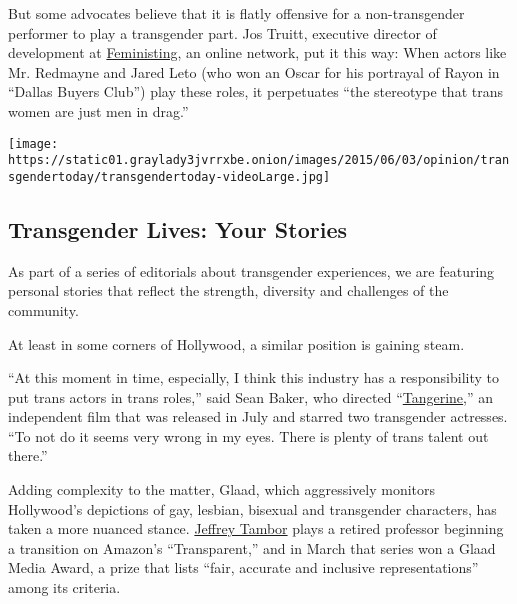 But some advocates believe that it is flatly offensive for a
non-transgender performer to play a transgender part. Jos Truitt,
executive director of development at
\href{http://feministing.com/2014/01/13/the-golden-globes-give-jared-leto-an-award-for-playing-a-trans-woman-because-hollywood-is-terrible/}{Feministing},
an online network, put it this way: When actors like Mr. Redmayne and
Jared Leto (who won an Oscar for his portrayal of Rayon in ``Dallas
Buyers Club'') play these roles, it perpetuates ``the stereotype that
trans women are just men in drag.''

\href{https://www.nytimes3xbfgragh.onion/interactive/2015/opinion/transgender-today-your-stories.html}{}

\texttt{[image: https://static01.graylady3jvrrxbe.onion/images/2015/06/03/opinion/transgendertoday/transgendertoday-videoLarge.jpg]}

\hypertarget{transgender-lives-your-stories}{%
\subsection{Transgender Lives: Your
Stories}\label{transgender-lives-your-stories}}

As part of a series of editorials about transgender experiences, we are
featuring personal stories that reflect the strength, diversity and
challenges of the community.

At least in some corners of Hollywood, a similar position is gaining
steam.

``At this moment in time, especially, I think this industry has a
responsibility to put trans actors in trans roles,'' said Sean Baker,
who directed
``\href{http://www.nytimes3xbfgragh.onion/2015/07/10/movies/review-tangerine-a-madcap-buddy-picture-about-transgender-prostitutes.html}{Tangerine},''
an independent film that was released in July and starred two
transgender actresses. ``To not do it seems very wrong in my eyes. There
is plenty of trans talent out there.''

Adding complexity to the matter, Glaad, which aggressively monitors
Hollywood's depictions of gay, lesbian, bisexual and transgender
characters, has taken a more nuanced stance.
\href{http://www.nytimes3xbfgragh.onion/2014/09/27/arts/television/transparent-with-jeffrey-tambor-begins-on-amazon.html}{Jeffrey
Tambor} plays a retired professor beginning a transition on Amazon's
``Transparent,'' and in March that series won a Glaad Media Award, a
prize that lists ``fair, accurate and inclusive representations'' among
its criteria.

